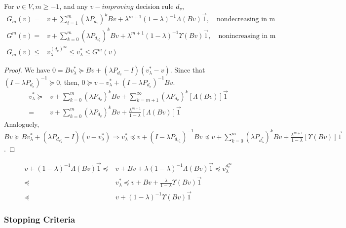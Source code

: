 \begin{theorem}
    For $ v \in V, m \ge -1 $, and any $ v-improving $ decision rule $ d_v $,
    \begin{align*}
        G_m(v) =& v + \sum^{m}_{i=1} {(\lambda P_{d_v})}^k Bv + \lambda^{m+1}{(1-\lambda)}^{-1} \Lambda (Bv) \vec{1}, \quad \text{nondecreasing in m}\\
        G^m(v) =& v + \sum^{m}_{k=0} {(\lambda P_{d_{v^*_{\lambda}}})}^k Bv + \lambda^{m+1}{(1-\lambda)}^{-1} \Upsilon(Bv) \vec{1}, \quad \text{nonincreasing in m}\\
        G_m(v) \le& v^{{(d_v)}^\infty}_\lambda \le v^*_{\lambda} \le G^m(v)
    \end{align*}
    \begin{proof}
        We have $ 0 = B v^*_\lambda \succeq Bv + (\lambda P_{d_v} - I)(v^*_\lambda - v) $.
        Since that $ {(I - \lambda P_{d_v})}^{-1} \succeq 0 $, 
        then, $ 0 \succeq v - v^*_\lambda + {(I - \lambda P_{d_v})}^{-1} Bv $.
        \begin{align*}
            v^*_\lambda \succeq& v + \sum^{m}_{k=0} {(\lambda P_{d_v})}^k Bv + \sum^{\infty}_{k=m+1} {(\lambda P_{d_v})}^k [\Lambda(Bv)] \vec{1}\\
            =& v + \sum^{m}_{k=0} {(\lambda P_{d_v})}^k Bv + \frac{\lambda^{m+1}}{1-\lambda} [\Lambda(Bv)]\vec{1}
        \end{align*}
        Analoguely, $ Bv \succeq Bv^*_{\lambda} + (\lambda P_{d_{v^*_{\lambda}}} - I)(v - v^*_{\lambda}) \Rightarrow v^*_\lambda \preceq v + {(I - \lambda P_{d_{v^*_{\lambda}}})}^{-1} Bv \preceq v + \sum^{m}_{k=0} {(\lambda P_{d^*_\lambda})}^k Bv + \frac{\lambda^{m+1}}{1-\lambda} [\Upsilon(Bv)] \vec{1}$.
    \end{proof}
\end{theorem}

\begin{corollary}
    \begin{align*}
        v + {(1-\lambda)}^{-1} \Lambda(Bv) \vec{1}
        \preceq& v + Bv + \lambda {(1-\lambda)}^{-1} \Lambda(Bv) \vec{1} \preceq v^{d^\infty_v}_\lambda\\
        \preceq& v^*_\lambda \preceq v+Bv+ \frac{\lambda}{{1-\lambda}} \Upsilon(Bv) \vec{1}\\
        \preceq& v + {(1-\lambda)}^{-1} \Upsilon(Bv) \vec{1}
    \end{align*}
\end{corollary}

\subsubsection{Stopping Criteria}%
\label{ssub:stopping_criteria}

